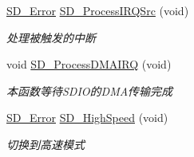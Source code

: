 \begin{DoxyCompactItemize}
\hyperlink{group__sd__card_gacff91fa68daa1d1ee967b5b3fb3dbd8c}{S\+D\+\_\+\+Error} \hyperlink{group__sd__card__private_gab21b0412e865d8cabc915dc840fa1ccc}{S\+D\+\_\+\+Process\+I\+R\+Q\+Src} (void)
\begin{DoxyCompactList}\small\item\em 处理被触发的中断 \end{DoxyCompactList}\item 
void \hyperlink{group__sd__card__private_ga52ec18498c19918549142f6680a7b21e}{S\+D\+\_\+\+Process\+D\+M\+A\+I\+RQ} (void)\hypertarget{group__sd__card__private_ga52ec18498c19918549142f6680a7b21e}{}\label{group__sd__card__private_ga52ec18498c19918549142f6680a7b21e}

\begin{DoxyCompactList}\small\item\em 本函数等待\+S\+D\+I\+O的\+D\+M\+A传输完成 \end{DoxyCompactList}\item 
\hyperlink{group__sd__card_gacff91fa68daa1d1ee967b5b3fb3dbd8c}{S\+D\+\_\+\+Error} \hyperlink{group__sd__card__private_ga2457c748cf09c7ad5d3c9211d11e3fab}{S\+D\+\_\+\+High\+Speed} (void)
\begin{DoxyCompactList}\small\item\em 切换到高速模式 \end{DoxyCompactList}\end{DoxyCompactItemize}
